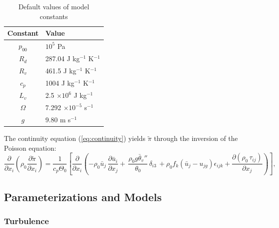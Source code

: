 \documentclass[11pt,a4paper]{article}
\begin{document}
\begin{table}[htb]
\caption{Default values of model constants} \label{tbl:constants}
\begin{center}
\begin{tabular}{cl}
Constant & Value \\ \hline \hline
$p_{00}$   & $10^5$   Pa \\
$R_d$      & 287.04 J kg$^{-1}$ K$^{-1}$ \\
$R_v$      & 461.5  J kg$^{-1}$ K$^{-1}$ \\
$c_p$      & 1004   J kg$^{-1}$ K$^{-1}$ \\
$L_v$      & 2.5 $\times 10 ^6$ J kg$^{-1}$ \\
$\Omega$   & 7.292 $\times 10 ^{-5}$ s$^{-1}$ \\
$g$        & 9.80 m s$^{-1}$ \\ \hline
\end{tabular}
\end{center}
\end{table}

The continuity equation (\ref{eq:continuity}) yields $\tilde{\pi}$ through the
inversion of the Poisson equation:
\begin{equation}
\frac{\partial}{\partial x_i} \left( \rho_0 \frac{\partial
\tilde{\pi}}{\partial x_i} \right) = \frac{1}{c_p\Theta_0}
\left[\frac{\partial }{\partial x_i} \left ( - \rho_0 \bar{u}_j \,
\frac{\partial \bar{u}_i}{\partial x_j} + \, \frac{\rho_0 g
\bar{\theta}_v ''}{\theta_0} \, \delta_{i3} \, + \rho_0 f_k (\bar{u}_j
- u_{jg}) \epsilon_{ijk} + \frac{\partial (\rho_0 \, \tau_{ij})}
{\partial x_j} \right ) \right],
\label{eq:FP}
\end{equation}

\subsection{Parameterizations and Models} 

\subsubsection{Turbulence}
\end{document}
